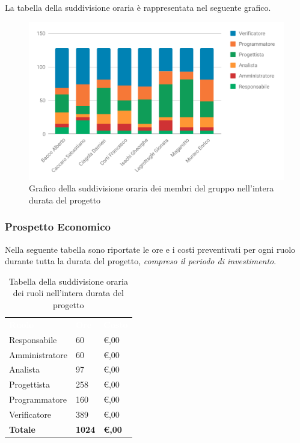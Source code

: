 La tabella della suddivisione oraria è rappresentata nel seguente grafico.
\begin{figure}[H]
	\includegraphics[width=1\linewidth]{Preventivo/grafici/TI1.pdf}
	\caption{Grafico della suddivisione oraria dei membri del gruppo nell'intera durata del progetto}
\end{figure}

\subsubsection{Prospetto Economico}
Nella seguente tabella sono riportate le ore e i costi preventivati per ogni ruolo durante tutta la durata del progetto, \emph{compreso il periodo di investimento}.


\begin{table}[H]	
	\begin{center}
	    \begin{tabular}{C{4cm}C{1cm}C{3,5cm}}
			\textcolor{white}{\textbf{Ruolo}} & \textcolor{white}{\textbf{Ore}} & \textcolor{white}{\textbf{Costo}}
			\\
			Responsabile & 60 & \euro {},00 \\
			Amministratore & 60 & \euro {},00 \\
			Analista & 97 & \euro {},00 \\
			Progettista & 258 & \euro {},00 \\
			Programmatore & 160 & \euro {},00 \\
			Verificatore & 389 & \euro {},00 \\
			\textbf{Totale} & \textbf{1024} & \textbf{\euro {},00} \\

		\end{tabular}
	    \caption{Tabella della suddivisione oraria dei ruoli nell'intera durata del progetto} \label{tab:tabellaRuoliProgInt} 
	\end{center}
\end{table}


